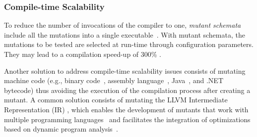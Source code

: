 %
%

%

\subsubsection{Compile-time Scalability}
\label{sec:compile:time}


To reduce the number of invocations of the compiler to one, \emph{mutant schemata} include all the mutations into a single executable~\cite{untch1993mutation}. 
With mutant schemata, the mutations to be tested are selected at run-time through configuration parameters. They may lead to a compilation speed-up of 300\% \cite{papadakis2010automatic}. 


Another solution to address compile-time scalability issues consists of mutating machine code  (e.g., binary code~\cite{becker2012xemu}, assembly language~\cite{crouzet2006sesame},
Java~\cite{ma2006mujava}, 
 and
.NET~\cite{derezinska2011object} bytecode) thus avoiding the execution of the compilation process after creating a mutant. 
A common solution consists of mutating the
 LLVM Intermediate Representation (IR) \cite{hariri2016evaluating}, 
which enables the development of mutants that work with multiple programming languages~\cite{hariri2019comparing} and facilitates the integration of optimizations based on dynamic program analysis~\cite{denisov2018mull}.


